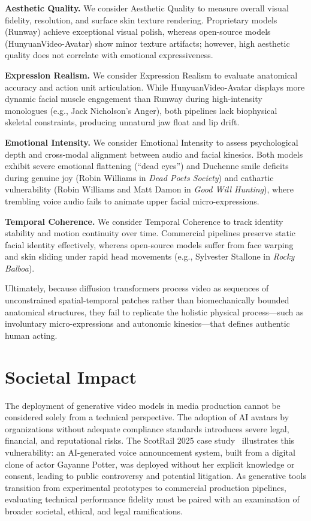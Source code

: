 \documentclass[pdflatex,sn-mathphys-num]{sn-jnl}
\newcommand{\emAnger}{Anger\xspace}
\theoremstyle{thmstyleone}
\theoremstyle{thmstyletwo}
\theoremstyle{thmstylethree}
\begin{document}
\textbf{Aesthetic Quality.} We consider Aesthetic Quality to measure overall visual fidelity, resolution, and surface skin texture rendering. Proprietary models (Runway) achieve exceptional visual polish, whereas open-source models (HunyuanVideo-Avatar) show minor texture artifacts; however, high aesthetic quality does not correlate with emotional expressiveness.

\textbf{Expression Realism.} We consider Expression Realism to evaluate anatomical accuracy and action unit articulation. While HunyuanVideo-Avatar displays more dynamic facial muscle engagement than Runway during high-intensity monologues (e.g., Jack Nicholson's \emAnger), both pipelines lack biophysical skeletal constraints, producing unnatural jaw float and lip drift.

\textbf{Emotional Intensity.} We consider Emotional Intensity to assess psychological depth and cross-modal alignment between audio and facial kinesics. Both models exhibit severe emotional flattening (``dead eyes'') and Duchenne smile deficits during genuine joy (Robin Williams in \textit{Dead Poets Society}) and cathartic vulnerability (Robin Williams and Matt Damon in \textit{Good Will Hunting}), where trembling voice audio fails to animate upper facial micro-expressions.

\textbf{Temporal Coherence.} We consider Temporal Coherence to track identity stability and motion continuity over time. Commercial pipelines preserve static facial identity effectively, whereas open-source models suffer from face warping and skin sliding under rapid head movements (e.g., Sylvester Stallone in \textit{Rocky Balboa}).

Ultimately, because diffusion transformers process video as sequences of unconstrained spatial-temporal patches rather than biomechanically bounded anatomical structures, they fail to replicate the holistic physical process---such as involuntary micro-expressions and autonomic kinesics---that defines authentic human acting.


\section{Societal Impact}\label{sec5:societal}

The deployment of generative video models in media production cannot be considered solely from a technical perspective. The adoption of AI avatars by organizations without adequate compliance standards introduces severe legal, financial, and reputational risks. The ScotRail 2025 case study~\cite{pavis2025ai, signapselinkedin} illustrates this vulnerability: an AI-generated voice announcement system, built from a digital clone of actor Gayanne Potter, was deployed without her explicit knowledge or consent, leading to public controversy and potential litigation. As generative tools transition from experimental prototypes to commercial production pipelines, evaluating technical performance fidelity must be paired with an examination of broader societal, ethical, and legal ramifications. 
\end{document}
